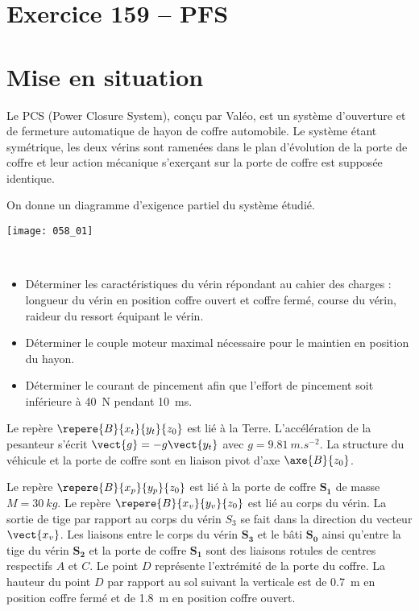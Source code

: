 \section*{Exercice 159 -- PFS}

\setcounter{exo}{0}

\section*{Mise en situation}
\ifprof
\else
Le PCS (Power Closure System), conçu par Valéo, est un système d’ouverture et de fermeture automatique de
hayon de coffre automobile.
Le système étant symétrique, les deux vérins sont ramenées dans 
le plan d’évolution de la porte de coffre et leur action mécanique s’exerçant sur la porte de coffre est supposée identique.

On donne un diagramme d'exigence partiel du système étudié. 

\begin{center}
\texttt{[image: 058\_01]}
\end{center}


\begin{obj}~\\
\begin{itemize}
\item Déterminer les caractéristiques du vérin répondant au cahier des charges : longueur
du vérin en position coffre ouvert et coffre fermé, course du vérin, raideur du ressort équipant le vérin. 
\item Déterminer le couple moteur maximal nécessaire pour le maintien en position du hayon.
\item Déterminer le courant de pincement afin que l'effort de pincement soit inférieure à \SI{40}{N} pendant \SI{10}{ms}.
\end{itemize}
\end{obj}




Le repère $\repere{B}{x_t}{y_t}{z_0}$ est lié à la Terre. L’accélération de la pesanteur s’écrit $\vect{g}=-g\vect{y_t}$ avec $g=\SI{9,81}{m.s^{-2}}$. La structure du véhicule et la porte de coffre sont en liaison pivot d’axe $\axe{B}{z_0}$.

Le repère $\repere{B}{x_p}{y_p}{z_0}$ est lié à la porte de coffre \textbf{$\bm{S_1}$} de masse $M=\SI{30}{kg}$. Le repère $\repere{B}{x_v}{y_v}{z_0}$ est lié au corps du vérin. La sortie
de tige par rapport au corps du vérin \textbf{$S_3$} se fait dans la direction du vecteur $\vect{x_v}$.
Les liaisons entre le corps du vérin \textbf{$\bm{S_3}$} et le bâti \textbf{$\bm{S_0}$} ainsi qu'entre la tige du vérin \textbf{$\bm{S_2}$} et la porte de coffre \textbf{$\bm{S_1}$} sont des liaisons rotules de centres respectifs $A$ et $C$.
Le point $D$ représente l’extrémité de la porte du coffre. La hauteur du point $D$ par rapport au sol suivant la
verticale est de \SI{0,7}{m} en position coffre fermé et de \SI{1,8}{m} en position coffre ouvert.

